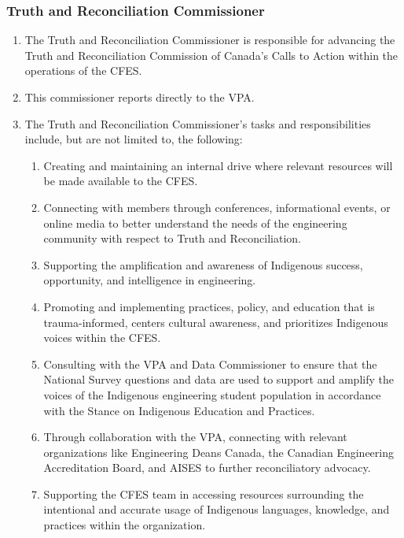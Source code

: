 \subsubsection{Truth and Reconciliation Commissioner}
\label{truth-and-reconciliation-commissioner}

\begin{enumerate}
 \item
  The Truth and Reconciliation Commissioner is responsible for advancing the Truth and Reconciliation Commission of Canada's Calls to Action within the operations of the CFES.
 \item
  This commissioner reports directly to the VPA.
 \item
  The Truth and Reconciliation Commissioner's tasks and responsibilities include, but are not limited to, the following:

  \begin{enumerate}
   \item
    Creating and maintaining an internal drive where relevant resources will be made available to the CFES.
   \item
    Connecting with members through conferences, informational events, or online media to better understand the needs of the engineering community with respect to Truth and Reconciliation.
   \item
    Supporting the amplification and awareness of Indigenous success, opportunity, and intelligence in engineering.
   \item
    Promoting and implementing practices, policy, and education that is trauma-informed, centers cultural awareness, and prioritizes Indigenous voices within the CFES.
   \item
    Consulting with the VPA and Data Commissioner to ensure that the National Survey questions and data are used to support and amplify the voices of the Indigenous engineering student population in accordance with the Stance on Indigenous Education and Practices.
   \item
    Through collaboration with the VPA, connecting with relevant organizations like Engineering Deans Canada, the Canadian Engineering Accreditation Board, and AISES to further reconciliatory advocacy.
   \item
    Supporting the CFES team in accessing resources surrounding the intentional and accurate usage of Indigenous languages, knowledge, and practices within the organization.
  \end{enumerate}


\end{enumerate}
